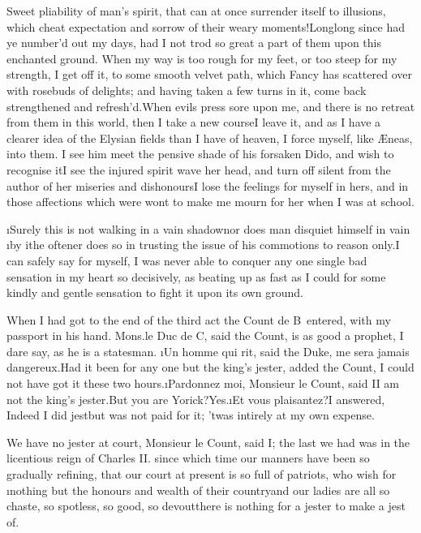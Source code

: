 \documentclass[twoside]{article}
\begin{document}
Sweet pliability of man’s spirit, that can
at once surrender itself to illusions,
which cheat expectation and sorrow of
their weary moments!\tskk Long\tskk long
since had ye number’d out my days, had I
not trod so great a part of them upon this
enchanted ground.  When my way is too
rough for my feet, or too steep for my
strength, I get off it, to some smooth
velvet path, which Fancy has scattered
over with rosebuds of delights; and having
taken a few turns in it, come back
strengthened and refresh’d.\tskk When
evils press sore upon me, and there is no
retreat from them in this world, then I
take a new course\tskk I leave it,\tskk
and as I have a clearer idea of the
Elysian fields than I have of heaven, I
force myself, like Æneas, into them.\tskk
I see him meet the pensive shade of his
forsaken Dido, and wish to recognise
it\tskk I see the injured spirit wave her
head, and turn off silent from the author
of her miseries and dishonours\tskk I
lose the feelings for myself in hers, and
in those affections which were wont to
make me mourn for her when I was at
school.

\i{Surely this is not walking in a vain
shadow\tskk nor does man disquiet himself}
in vain \i{by it}\tskk he oftener does so
in trusting the issue of his commotions to
reason only.\tskk I can safely say for
myself, I was never able to conquer any
one single bad sensation in my heart so
decisively, as beating up as fast as I
could for some kindly and gentle sensation
to fight it upon its own ground.

When I had got to the end of the third act
the Count de B\anon\ entered, with my
passport in his hand.  Mons.\@ le Duc de
C\anon, said the Count, is as good a
prophet, I dare say, as he is a statesman.
\i{Un homme qui rit}, said the Duke, \i{ne
sera jamais dangereux}.\tskk Had it been
for any one but the king’s jester, added
the Count, I could not have got it these
two hours.\tskk \i{Pardonnez moi},
Monsieur le Count, said I\tskk I am not
the king’s jester.\tskk But you are
Yorick?\tskk Yes.\tskk \i{Et vous
plaisantez}?\tskk I answered, Indeed I did
jest\tskk but was not paid for it;\tskk
’twas intirely at my own expense.

We have no jester at court, Monsieur le
Count, said I; the last we had was in the
licentious reign of Charles II.\tskk
since which time our manners have been so
gradually refining, that our court at
present is so full of patriots, who wish
for \i{nothing} but the honours and wealth
of their country\tskk and our ladies are
all so chaste, so spotless, so good, so
devout\tskk there is nothing for a jester
to make a jest of.\tskk 
\end{document}
